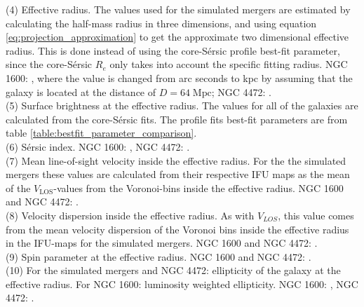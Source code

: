 \documentclass[english, twoside]{HYgradu}
\begin{document}
\begin{table}
{	(4) Effective radius. The values used for the simulated mergers are estimated by calculating the half-mass radius in three dimensions, and using equation \ref{eq:projection_approximation} to get the approximate two dimensional effective radius. This is done instead of using the core-Sérsic profile best-fit parameter, since the core-Sérsic $R_e$ only takes into account the specific fitting radius. NGC 1600: \cite{Thomas2016}, where the value is changed from arc seconds to kpc by assuming that the galaxy is located at the distance of $D = 64 \; \mathrm{Mpc}$; NGC 4472: \cite{Veale2017veldisp}. \\
	(5) Surface brightness at the effective radius. The values for all of the galaxies are calculated from the core-Sérsic fits. The profile fits best-fit parameters are from table \ref{table:bestfit_parameter_comparison}. \\
	(6) Sérsic index. NGC 1600: \cite{Thomas2016}, NGC 4472: \cite{Rusli2013}. \\
	(7) Mean line-of-sight velocity inside the effective radius. For the the simulated mergers these values are calculated from their respective IFU maps as the mean of the $V_\mathrm{LOS}$-values from the Voronoi-bins inside the effective radius. NGC 1600 and NGC 4472: \cite{Bender1994}. \\
	(8) Velocity dispersion inside the effective radius. As with $V_{LOS}$, this value comes from the mean velocity dispersion of the Voronoi bins inside the effective radius in the IFU-maps for the simulated mergers. NGC 1600 and NGC 4472: \cite{Veale2017veldisp}.\\
	(9) Spin parameter at the effective radius. NGC 1600 and NGC 4472: \citep{Veale2018lambda}. \\
	(10) For the simulated mergers and NGC 4472: ellipticity of the galaxy at the effective radius. For NGC 1600: luminosity weighted ellipticity. NGC 1600: \cite{Goullaud2018}, NGC 4472: \cite{Emsellem2011}.
	}
	\label{table:snap6_vs_NGC1600}
\end{table}
\end{document}

